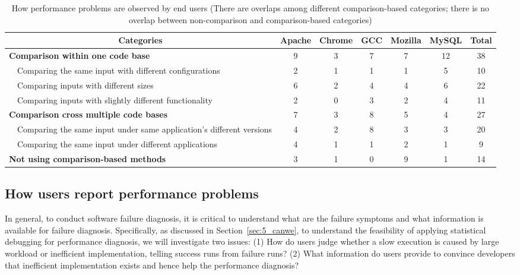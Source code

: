 \begin{table*}[tb!]
\begin{adjustwidth}{-1.5in}{-1.5in}
\scriptsize
\centering
{
\begin{tabular}{lcccccc}
\toprule
\multicolumn{1}{c}{Categories} &Apache&Chrome&GCC&Mozilla&MySQL&Total\\
\midrule
\multicolumn{1}{l}{\textbf{Comparison within one code base}}
&9&3&7&7&12&38\\
\ \ Comparing the same input with different configurations &2&1&1&1&5&10\\
\ \ Comparing inputs with different sizes&6&2&4&4&6&22\\
\ \ Comparing inputs with slightly different functionality&2&0&3&2&4&11\\
\midrule
\multicolumn{1}{l}{\textbf{Comparison cross multiple code bases}}
&7&3&8&5&4&27\\
\ \ Comparing the same input under same application's different versions
&4&2&8&3&3&20\\
\ \ Comparing the same input under different applications
&4&1&1&2&1&9\\
\midrule
\multicolumn{1}{l}{\textbf{Not using comparison-based methods}}
&3&1&0&9&1&14\\
\bottomrule
\end{tabular}
}
\end{adjustwidth}
\caption{How performance problems are observed by end users (There are overlaps among
    different comparison-based categories; there is no overlap between non-comparison
    and comparison-based categories)}
\label{tab:5_cmp}
\end{table*}







\subsection{How users report performance problems}
In general, to conduct software failure diagnosis, it is critical to understand 
what are the failure symptoms and what information is available for failure
diagnosis. 
Specifically, as discussed in Section~\ref{sec:5_canwe}, to understand the
feasibility of applying statistical debugging for performance diagnosis, we
will investigate two issues: (1)
How do users judge whether a slow execution is caused by large workload or
inefficient implementation, telling success runs from failure
runs?
(2)
What information do users provide to convince developers that inefficient
implementation exists and hence help the performance diagnosis?

